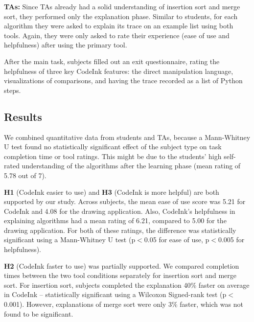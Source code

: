 \noindent \textbf{TAs:} Since TAs already had a solid understanding of insertion
sort and merge sort, they performed only the explanation phase. Similar to
students, for each algorithm they were asked to explain its trace on an example
list using both tools. Again, they were only asked to rate their experience
(ease of use and helpfulness) after using the primary tool.

After the main task, subjects filled out an exit questionnaire, rating the
helpfulness of three key CodeInk features: the direct manipulation language,
visualizations of comparisons, and having the trace recorded as a list of Python
steps.


\subsection{Results}

We combined quantitative data from students and TAs, because a Mann-Whitney U
test found no statistically significant effect of the subject type on task
completion time or tool ratings. This might be due to the students' high
self-rated understanding of the algorithms after the learning phase (mean rating
of 5.78 out of 7).

\textbf{H1} (CodeInk easier to use) and \textbf{H3} (CodeInk is more helpful)
are both supported by our study. Across subjects, the mean ease of use score was
5.21 for CodeInk and 4.08 for the drawing application. Also, CodeInk's
helpfulness in explaining algorithms had a mean rating of 6.21, compared to 5.00
for the drawing application. For both of these ratings, the difference was
statistically significant using a Mann-Whitney U test (p$<$0.05 for ease of use,
p$<$0.005 for helpfulness).


\textbf{H2} (CodeInk faster to use) was partially supported. We compared
completion times between the two tool conditions separately for insertion sort
and merge sort. For insertion sort, subjects completed the explanation 40\%
faster on average in CodeInk -- statistically significant using a Wilcoxon
Signed-rank test (p$<$0.001). However, explanations of merge sort were only 3\%
faster, which was not found to be significant.


